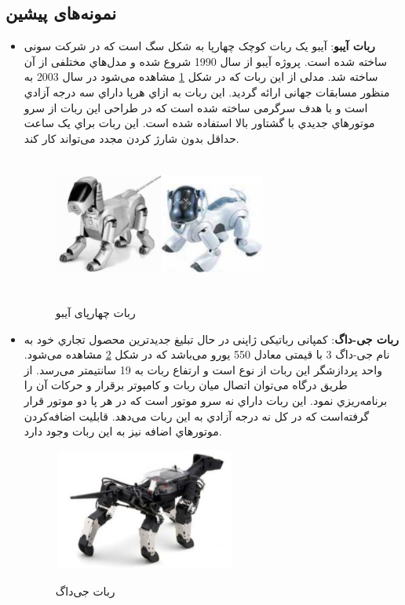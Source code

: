\subsection{نمونه‌های پیشین}
\begin{itemize}
\item  
\textbf{ربات آیبو}\unskip{}:
آیبو یک ربات کوچک چهارپا به شكل سگ است که در شرکت سونی
ساخته شده است. پروژه آیبو از سال 1990 شروع شده و مدل‌هاي
مختلفی از آن ساخته شد. مدلی از این ربات که در شکل
\ref{ربات آیبو}
مشاهده می‌شود در سال 2003 به منظور مسابقات جهانی ارائه گردید. این ربات به ازاي هرپا داراي سه درجه آزادي است و با هدف سرگرمی ساخته شده است که در طراحی این ربات از سرو موتورهاي جدیدي با گشتاور بالا استفاده شده است. این ربات براي یک ساعت حداقل بدون شارژ کردن مجدد می‌تواند کار کند\cite{AIBO}.
    \begin{figure}[!h]
	\vspace{0.2cm}
	\centering
	\includegraphics[height=4.5cm,width=7cm]{./Images/CH1/AIBO.png}
	‌\caption[ربات چهارپای آیبو]{ربات چهارپای آیبو\cite{AIBO}}
	\label{ربات آیبو}
	\end{figure}
	
\item	
\textbf{ربات جی-داگ}:
کمپانی رباتیكی ژاپنی
 در حال تبلیغ جدیدترین محصول
تجاري خود به نام جی-داگ 3 با قیمتی معادل 550 یورو می‌باشد که در شكل
\ref{ربات جی‌داگ}
مشاهده می‌شود. واحد پردازشگر این ربات از نوع 
است و ارتفاع ربات به 19 سانتیمتر می‌رسد. از طریق درگاه
می‌توان اتصال میان ربات و کامپوتر برقرار و حرکات آن را برنامه‌ریزي نمود. این ربات داراي نه سرو موتور است که در هر پا دو موتور قرار گرفته‌است که در کل نه درجه آزادي به این ربات می‌دهد. قابلیت اضافه‌کردن موتورهاي اضافه نیز به این ربات وجود دارد\cite{G-Dog}.
    \begin{figure}[!h]	
	\vspace{0.2cm}
	\centering
	\includegraphics[height=4cm,width=6cm]{./Images/CH1/G_dog.png}
	‌\caption[ربات جی‌داگ]{ربات جی‌داگ\cite{G-Dog}}
	\label{ربات جی‌داگ}
	\end{figure}


\end{itemize}
